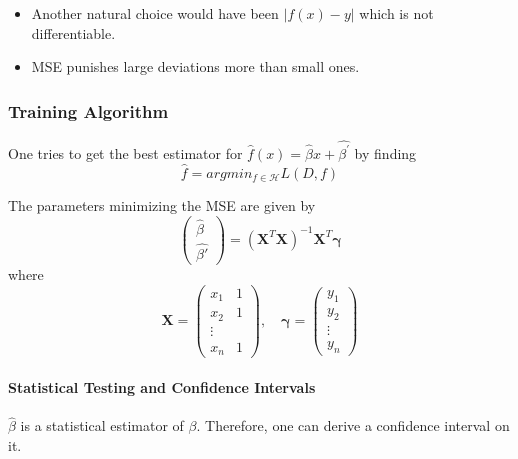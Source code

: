 
\begin{itemize}
    \item Another natural choice would have been $|f(x)-y|$ which is not differentiable.
    \item MSE punishes large deviations more than small ones.
\end{itemize}

\subsubsection{Training Algorithm}
One tries to get the best estimator for $\hat{f}(x)=\hat{\beta}x+\widehat{\beta^{\prime}}$ by finding
\begin{equation*}
    \hat{f}=argmin_{f\in\mathcal{H}}L(D,f)
\end{equation*}


The parameters minimizing the MSE are given by
\begin{equation*}
    \begin{pmatrix}
        \hat{\beta} \\
        \widehat{\beta'}
    \end{pmatrix}
    ={(\mathbf{X}^T \mathbf{X})}^{-1}\mathbf{X}^T\mathbf{\gamma}
\end{equation*}
where
\begin{equation*}
    \mathbf{X}=
    \begin{pmatrix}
        x_1 & 1 \\
        x_2 & 1 \\
        \vdots  \\
        x_n & 1
    \end{pmatrix},\quad
    \mathbf{\gamma}=
    \begin{pmatrix}
        y_1    \\
        y_2    \\
        \vdots \\
        y_n
    \end{pmatrix}
\end{equation*}

\paragraph{Statistical Testing and Confidence Intervals}


$\hat{\beta}$ is a statistical estimator of $\beta$. Therefore, one can derive a confidence interval on it.

